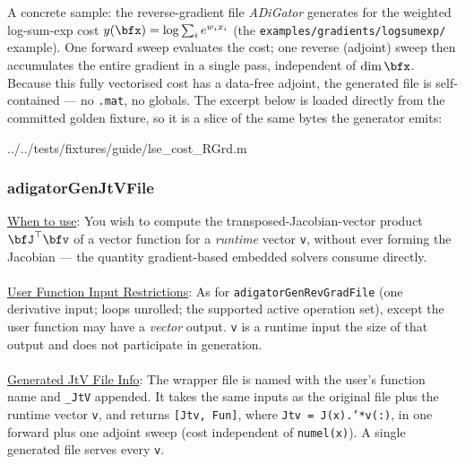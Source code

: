 \documentclass[10pt,pdftex]{article}
\begin{document}
A concrete sample: the reverse-gradient file \emph{ADiGator} generates for the
weighted log-sum-exp cost $y(\bfx)=\log\sum_i e^{w_i x_i}$ (the
\texttt{examples/gradients/logsumexp/} example). One forward sweep evaluates the
cost; one reverse (adjoint) sweep then accumulates the entire gradient in a
single pass, independent of $\dim\bfx$. Because this fully vectorised cost has a
data-free adjoint, the generated file is self-contained --- no \texttt{.mat}, no
globals. The excerpt below is loaded directly from the committed golden fixture,
so it is a slice of the same bytes the generator emits:

%
  {../../tests/fixtures/guide/lse_cost_RGrd.m}

\subsubsection{adigatorGenJtVFile}
\underline{When to use}: You wish to compute the transposed-Jacobian-vector product $\bfJ^\top\bfv$ of a vector function for a \emph{runtime} vector \texttt{v}, without ever forming the Jacobian --- the quantity gradient-based embedded solvers consume directly.\\\\
\underline{User Function Input Restrictions}: As for \texttt{adigatorGenRevGradFile} (one derivative input; loops unrolled; the supported active operation set), except the user function may have a \emph{vector} output. \texttt{v} is a runtime input the size of that output and does not participate in generation.\\\\
\underline{Generated JtV File Info}: The wrapper file is named with the user's function name and \texttt{\_JtV} appended. It takes the same inputs as the original file plus the runtime vector \texttt{v}, and returns \texttt{[Jtv, Fun]}, where \texttt{Jtv = J(x).'*v(:)}, in one forward plus one adjoint sweep (cost independent of \texttt{numel(x)}). A single generated file serves every \texttt{v}.\\\\
\end{document}
